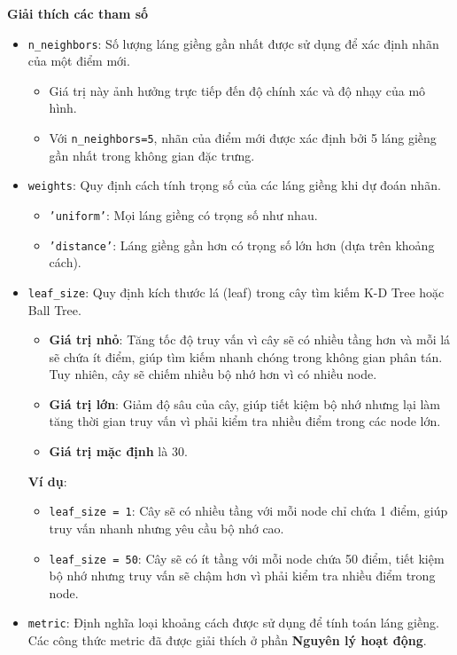 \documentclass[a4paper,12pt]{article}
\begin{document}
\noindent \textbf{Giải thích các tham số}
\begin{itemize}
    \item \texttt{n\_neighbors}: Số lượng láng giềng gần nhất được sử dụng để xác định nhãn của một điểm mới.
    \begin{itemize}
        \item Giá trị này ảnh hưởng trực tiếp đến độ chính xác và độ nhạy của mô hình.
        \item Với \texttt{n\_neighbors=5}, nhãn của điểm mới được xác định bởi 5 láng giềng gần nhất trong không gian đặc trưng.
    \end{itemize}

    \item \texttt{weights}: Quy định cách tính trọng số của các láng giềng khi dự đoán nhãn.
    \begin{itemize}
        \item \texttt{'uniform'}: Mọi láng giềng có trọng số như nhau.
        \item \texttt{'distance'}: Láng giềng gần hơn có trọng số lớn hơn (dựa trên khoảng cách).
    \end{itemize}

    \item \texttt{leaf\_size}: Quy định kích thước lá (leaf) trong cây tìm kiếm K-D Tree hoặc Ball Tree.
    \begin{itemize}
        \item \textbf{Giá trị nhỏ}: Tăng tốc độ truy vấn vì cây sẽ có nhiều tầng hơn và mỗi lá sẽ chứa ít điểm, giúp tìm kiếm nhanh chóng trong không gian phân tán. Tuy nhiên, cây sẽ chiếm nhiều bộ nhớ hơn vì có nhiều node.
        \item \textbf{Giá trị lớn}: Giảm độ sâu của cây, giúp tiết kiệm bộ nhớ nhưng lại làm tăng thời gian truy vấn vì phải kiểm tra nhiều điểm trong các node lớn.
        \item \textbf{Giá trị mặc định} là 30.
    \end{itemize}
    
    \noindent \textbf{Ví dụ}:
    \begin{itemize}
        \item \texttt{leaf\_size = 1}: Cây sẽ có nhiều tầng với mỗi node chỉ chứa 1 điểm, giúp truy vấn nhanh nhưng yêu cầu bộ nhớ cao.
        \item \texttt{leaf\_size = 50}: Cây sẽ có ít tầng với mỗi node chứa 50 điểm, tiết kiệm bộ nhớ nhưng truy vấn sẽ chậm hơn vì phải kiểm tra nhiều điểm trong node.
    \end{itemize}
    
    \item \texttt{metric}: Định nghĩa loại khoảng cách được sử dụng để tính toán láng giềng. Các công thức metric đã được giải thích ở phần \textbf{Nguyên lý hoạt động}.
\end{itemize}
\end{document}
